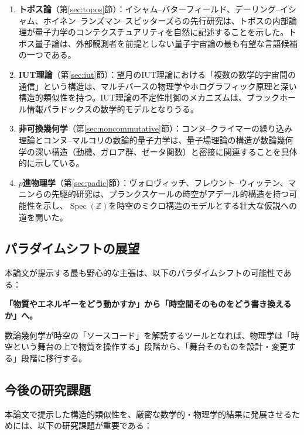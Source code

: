 \documentclass[12pt,a4paper]{ltjsarticle}
\theoremstyle{definition}
\newcommand{\Spec}{\operatorname{Spec}}
\begin{document}
\begin{enumerate}[leftmargin=2em]
  \item \textbf{トポス論}（第\ref{sec:topos}節）：イシャム--バターフィールド、デーリング--イシャム、ホイネン--ランズマン--スピッターズらの先行研究は、トポスの内部論理が量子力学のコンテクスチュアリティを自然に記述することを示した。トポス量子論は、外部観測者を前提としない量子宇宙論の最も有望な言語候補の一つである。

  \item \textbf{IUT理論}（第\ref{sec:iut}節）：望月のIUT理論における「複数の数学的宇宙間の通信」という構造は、マルチバースの物理学やホログラフィック原理と深い構造的類似性を持つ。IUT理論の不定性制御のメカニズムは、ブラックホール情報パラドックスの数学的モデルとなりうる。

  \item \textbf{非可換幾何学}（第\ref{sec:noncommutative}節）：コンヌ--クライマーの繰り込み理論とコンヌ--マルコリの数論的量子力学は、量子場理論の構造が数論幾何学の深い構造（動機、ガロア群、ゼータ関数）と密接に関連することを具体的に示している。

  \item \textbf{$p$進物理学}（第\ref{sec:padic}節）：ヴォロヴィッチ、フレウント--ウィッテン、マニンらの先駆的研究は、プランクスケールの時空がアデール的構造を持つ可能性を示し、$\Spec(\mathbb{Z})$を時空のミクロ構造のモデルとする壮大な仮説への道を開いた。
\end{enumerate}

\subsection{パラダイムシフトの展望}

本論文が提示する最も野心的な主張は、以下のパラダイムシフトの可能性である：

\begin{keyinsight}[パラダイムシフト]
\textbf{「物質やエネルギーをどう動かすか」から「時空間そのものをどう書き換えるか」へ。}

数論幾何学が時空の「ソースコード」を解読するツールとなれば、物理学は「時空という舞台の上で物質を操作する」段階から、「舞台そのものを設計・変更する」段階に移行する。
\end{keyinsight}

\subsection{今後の研究課題}

本論文で提示した構造的類似性を、厳密な数学的・物理学的結果に発展させるためには、以下の研究課題が重要である：
\end{document}
